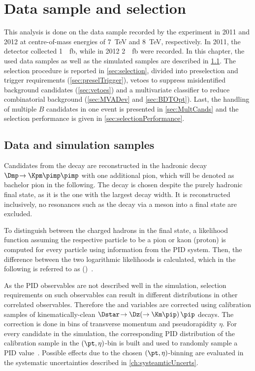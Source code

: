 \chapter{Data sample and selection}

\linespread{1.08}\selectfont
This analysis is done on the data sample recorded by the \lhcb experiment in \num{2011} and \num{2012} at centre-of-mass energies of \SI{7}{\tera\electronvolt} and \SI{8}{\tera\electronvolt}, respectively.
In \num{2011}, the detector collected \SI{1}{\per\femto\barn}, while in \num{2012} \SI{2}{\per\femto\barn} were recorded.
In this chapter, the used data samples as well as the simulated samples are described in \cref{sec:Samples}.
The selection procedure is reported in \cref{sec:selection}, divided into preselection and trigger requirements (\cref{sec:preselTrigger}), vetoes to suppress \eg misidentified background candidates (\cref{sec:vetoes}) and a multivariate classifier to reduce combinatorial background (\cref{sec:MVADev} and \cref{sec:BDTOpt}).
Last, the handling of multiple $B$ candidates in one event is presented in \cref{sec:MultCands} and the selection performance is given in \cref{sec:selectionPerformance}.

\section{Data and simulation samples}
\label{sec:Samples}

Candidates from the decay \BdToDpi are reconstructed in the hadronic decay $\Dmp\!\to\Kpm\pimp\pimp$ with one additional pion, which will be denoted as bachelor pion in the following.
The \D decay is chosen despite the purely hadronic final state, as it is the one with the largest decay width.
It is reconstructed inclusively, \ie no resonances such as the decay via a \Kstarz meson into a \kaon\pion final state are excluded.

To distinguish between the charged hadrons in the final state, a likelihood function assuming the respective particle to be a pion or kaon (proton) is computed for every particle using information from the PID system.
Then, the difference between the two logarithmic likelihoods is calculated, which in the following is referred to as \dllkpi (\dllppi)~\cite{Aaij:2014jba}.

As the PID observables are not described well in the simulation, selection requirements on such observables can result in different distributions in other correlated observables.
Therefore the \dllkpi and \dllppi variables are corrected using calibration samples of kinematically-clean $\Dstar\!\to\Dz\!\left(\to\Km\pip\right)\pip$ decays.
The correction is done in bins of transverse momentum \pt and pseudorapidity $\eta$.
For every candidate in the simulation, the corresponding PID distribution of the calibration sample in the $(\pt,\eta)$-bin is built and used to randomly sample a PID value~\cite{Anderlini:2202412}.
Possible effects due to the chosen $(\pt,\eta)$-binning are evaluated in the systematic uncertainties described in \cref{ch:systeamticUncerts}.

